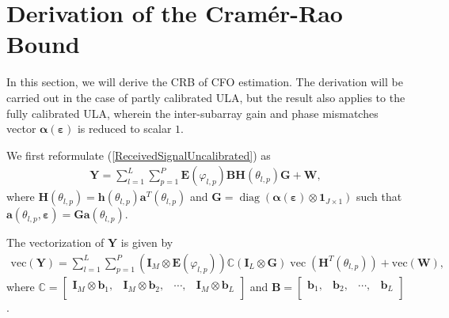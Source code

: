 \documentclass[12pt, draftclsnofoot, onecolumn]{IEEEtran}
\begin{document}
\section{Derivation of the Cram\'{e}r-Rao Bound}
In this section, we will derive the CRB of CFO estimation. The derivation will be carried out in the case of partly calibrated ULA, but the result also applies to the fully calibrated ULA, wherein the inter-subarray gain and phase mismatches vector $\boldsymbol{\alpha} \left( \boldsymbol{\varepsilon} \right)$ is reduced to scalar $1$.

We first reformulate (\ref{ReceivedSignalUncalibrated}) as
\begin{align}
\mathbf{Y} =\sum\limits_{l=1}^{L}{\sum\limits_{p=1}^{P}{\mathbf{E}\left( {{\varphi }_{l, p}} \right)\mathbf{BH}\left( {{\theta }_{l, p}} \right)\mathbf{G}}}+\mathbf{W},
\end{align}
where $\mathbf{H}\left( {{\theta }_{l, p}} \right) = \mathbf{h}\left( {{\theta }_{l,p}} \right){{\mathbf{a}}^{T}}\left( {{\theta }_{l, p}} \right)$ and $\mathbf{G} =\operatorname{diag}\left( \boldsymbol{\alpha }\left( \boldsymbol{\varepsilon } \right) \otimes {{\mathbf{1}}_{J\times 1}} \right)$ such that $\mathbf{a}\left( {{\theta }_{l, p}}, \boldsymbol{\varepsilon } \right) =\mathbf{G}\mathbf{a}\left( {{\theta }_{l, p}} \right)$.

The vectorization of $\mathbf{Y}$ is given by
\begin{align}
\text{vec} \left( \mathbf{Y} \right)  =\sum\limits_{l=1}^{L}{\sum\limits_{p=1}^{P}{\left( {{\mathbf{I}}_{M}}\otimes \mathbf{E}\left( {{\varphi }_{l,p}} \right) \right)\mathbb{C}\left( {{\mathbf{I}}_{L}}\otimes \mathbf{G} \right)\operatorname{vec}\left( {{\mathbf{H}}^{T}}\left( {{\theta }_{l,p}} \right) \right)}} +\text{vec}\left( \mathbf{W} \right),
\end{align}
where $\mathbb{C}=\left[ \begin{matrix}
   {{\mathbf{I}}_{M}}\otimes {{\mathbf{b}}_{1}}, & {{\mathbf{I}}_{M}}\otimes {{\mathbf{b}}_{2}}, & \cdots\!,  & {{\mathbf{I}}_{M}}\otimes {{\mathbf{b}}_{L}}  \\
\end{matrix} \right]$ and $\mathbf{B}=\left[ \begin{matrix}
   {{\mathbf{b}}_{1}}, & {{\mathbf{b}}_{2}}, & \cdots\!,  & {{\mathbf{b}}_{L}}  \\
\end{matrix} \right]$.
\end{document}
